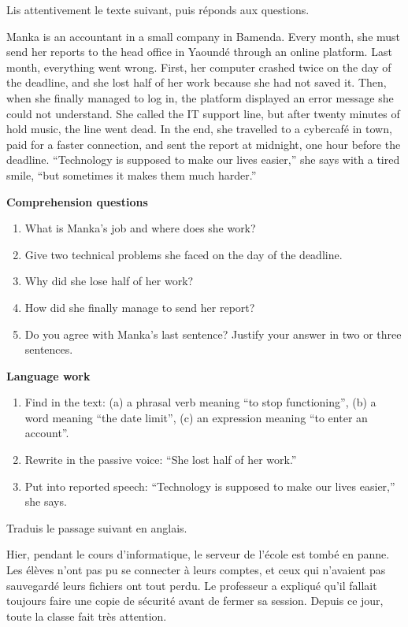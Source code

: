 \documentclass[11pt]{article}
\begin{document}
\begin{exercice}
Lis attentivement le texte suivant, puis réponds aux questions.
\begin{textebox}
Manka is an accountant in a small company in Bamenda. Every month, she must send her reports to the head office in Yaoundé through an online platform. Last month, everything went wrong. First, her computer crashed twice on the day of the deadline, and she lost half of her work because she had not saved it. Then, when she finally managed to log in, the platform displayed an error message she could not understand. She called the IT support line, but after twenty minutes of hold music, the line went dead. In the end, she travelled to a cybercafé in town, paid for a faster connection, and sent the report at midnight, one hour before the deadline. “Technology is supposed to make our lives easier,” she says with a tired smile, “but sometimes it makes them much harder.”
\end{textebox}
\textbf{Comprehension questions}
\begin{enumerate}
\item What is Manka's job and where does she work?
\item Give two technical problems she faced on the day of the deadline.
\item Why did she lose half of her work?
\item How did she finally manage to send her report?
\item Do you agree with Manka's last sentence? Justify your answer in two or three sentences.
\end{enumerate}
\textbf{Language work}
\begin{enumerate}
\item Find in the text: (a) a phrasal verb meaning “to stop functioning”, (b) a word meaning “the date limit”, (c) an expression meaning “to enter an account”.
\item Rewrite in the passive voice: “She lost half of her work.”
\item Put into reported speech: “Technology is supposed to make our lives easier,” she says.
\end{enumerate}
\end{exercice}

\begin{exercice}
Traduis le passage suivant en anglais.
\begin{textebox}
Hier, pendant le cours d'informatique, le serveur de l'école est tombé en panne. Les élèves n'ont pas pu se connecter à leurs comptes, et ceux qui n'avaient pas sauvegardé leurs fichiers ont tout perdu. Le professeur a expliqué qu'il fallait toujours faire une copie de sécurité avant de fermer sa session. Depuis ce jour, toute la classe fait très attention.
\end{textebox}
\end{exercice}
\end{document}
